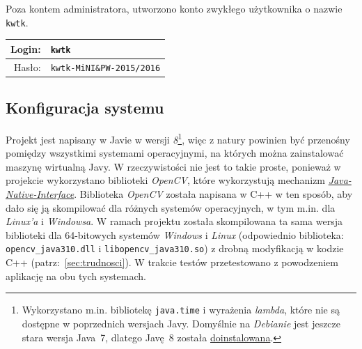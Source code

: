 \documentclass[a4paper,titlepage]{article}
\theoremstyle{break}
\numberwithin{equation}{subsection}
\begin{document}
Poza kontem administratora, utworzono konto zwykłego użytkownika o nazwie \texttt{kwtk}.

\begin{tabular}{r|l}
Login: & \texttt{kwtk}\\
\hline
Hasło: & \texttt{kwtk-MiNI\&PW-2015/2016}\\
\end{tabular}


\subsection{Konfiguracja systemu}

Projekt jest napisany w Javie w wersji \emph{8}\footnote{Wykorzystano m.in. bibliotekę \texttt{java.time} i wyrażenia \emph{lambda}, które nie są dostępne w poprzednich wersjach Javy. Domyślnie na \emph{Debianie} jest jeszcze stara wersja Java~7, dlatego Javę~8 została \href{http://www.webupd8.org/2014/03/how-to-install-oracle-java-8-in-debian.html}{doinstalowana}.}, więc z natury powinien być przenośny pomiędzy wszystkimi systemami operacyjnymi, na których można zainstalować maszynę wirtualną Javy. W rzeczywistości nie jest to takie proste, ponieważ w projekcie wykorzystano biblioteki \emph{OpenCV}, które wykorzystują mechanizm \href{https://en.wikipedia.org/wiki/Java_Native_Interface}{\emph{Java-Native-Interface}}. Biblioteka \emph{OpenCV} została napisana w C++ w ten sposób, aby dało się ją skompilować dla różnych systemów operacyjnych, w tym m.in. dla \emph{Linux'a} i \emph{Windowsa}. W ramach projektu została skompilowana ta sama wersja biblioteki dla 64-bitowych systemów \emph{Windows} i \emph{Linux} (odpowiednio biblioteka: \texttt{opencv\_java310.dll} i \texttt{libopencv\_java310.so}) z drobną modyfikacją w kodzie C++ (patrz:~\ref{sec:trudnosci}). W trakcie testów przetestowano z powodzeniem aplikację na obu tych systemach.
\end{document}
